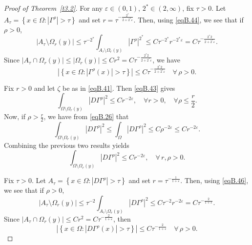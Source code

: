 \documentclass[12pt,reqno]{amsart}
\theoremstyle{plain}
\theoremstyle{definition}
\newenvironment{pf}
{\begin{proof}} {\end{proof}}
\newcommand{\eps}{\varepsilon}
\newcommand{\Ga}{\Gamma}
\newcommand{\Om}{\Omega}
\newcommand{\iny}{\infty}
\newcommand{\abs}[1]{\left\vert#1\right\vert}
\newcommand{\set}[1]{\left\{#1\right\}}
\newcommand{\pr}[1]{\left( #1 \right) }
\begin{document}
\begin{appendix}
\begin{pf}[Proof of Theorem~\ref{t3.2}]
For any $\eps \in \pr{0 ,1}$, $2^* \in \pr{2, \iny}$, fix $\tau > 0$.  
Let $A_\tau=\set{x\in \Om: \abs{\Ga^\rho}>\tau}$ and set $r=\tau^{-\frac{2^*}{2 + 2^* \eps}}$.  
Then, using \eqref{eqB.44}, we see that if $\rho > 0$,
\begin{equation*}
\abs{A_\tau\setminus \Om_r(y)}
\le \tau^{-2^*}\int_{A_\tau\setminus \Om_r(y)} \abs{\Ga^\rho}^{2^*} 
\le C \tau^{-2^*} r^{-2^*\eps}
= C \tau^{-\frac{2^* 2}{2 + 2^* \eps}}.
\end{equation*}
Since $\abs{A_\tau \cap \Om_r(y)} \le \abs{\Om_r(y)} \le Cr^2 = C \tau^{-\frac{2^* 2}{2 + 2^* \eps}}$, we have
\begin{equation}
\label{eqB.45}
\abs{\set{ x\in \Om: \abs{\Ga^\rho(x)} > \tau }}
\le C  \tau^{-\frac{2^* 2}{2 + 2^* \eps}} \quad \forall \, \rho > 0.
\end{equation}

Fix $r > 0$ and let $\zeta$ be as in \eqref{eqB.41}.  
Then \eqref{eqB.43} gives
\begin{equation*}
 \int_{\Om \setminus \Om_{r}(y)} \abs{D\Ga^\rho}^2 
 \le C r^{-2\eps}
 , \quad \forall r > 0, \quad \forall \rho\le \frac{r}{2}.
\end{equation*}
Now, if $\rho > \frac r 2$, we have from \eqref{eqB.26} that
\begin{equation*}
 \int_{\Om\setminus \Om_r(y)} \abs{D\Ga^\rho}^2 
 \le \int_{\Om} \abs{D\Ga^\rho}^2 
 \le C \rho^{-2\eps}
 \le C r^{-2\eps}.
\end{equation*}
Combining the previous two results yields
\begin{equation}
\label{eqB.46}
 \int_{\Om\setminus \Om_r(y)} \abs{D\Ga^\rho}^2 
 \le C r^{-2\eps}, \quad \forall \, r, \rho > 0.
\end{equation}

Fix $\tau > 0$.  
Let $A_\tau = \set{x \in \Om : \abs{D\Ga^\rho} > \tau}$ and set $r=\tau^{-\frac{1}{1+\eps}}$.  
Then, using \eqref{eqB.46}, we see that if $\rho > 0$,
$$\abs{A_\tau \setminus \Om_r(y)} 
\le \tau^{-2} \int_{A_\tau\setminus \Om_r(y)} \abs{D\Ga^\rho}^2 
\le C \tau^{-2} r^{-2\eps}
= C \tau^{-\frac{2}{1+\eps}}.$$
Since $\abs{A_\tau \cap \Om_r(y)} \le C r^2 = C\tau^{-\frac{2}{1+\eps}}$, then
\begin{equation}
\label{eqB.47}
 \abs{\set{x\in \Om: \abs{D\Ga^\rho(x)} > \tau }} \le C \tau^{-\frac{2}{1+\eps}}
 \quad \forall \, \rho > 0.
\end{equation}


\end{pf}
\end{appendix}
\end{document}
